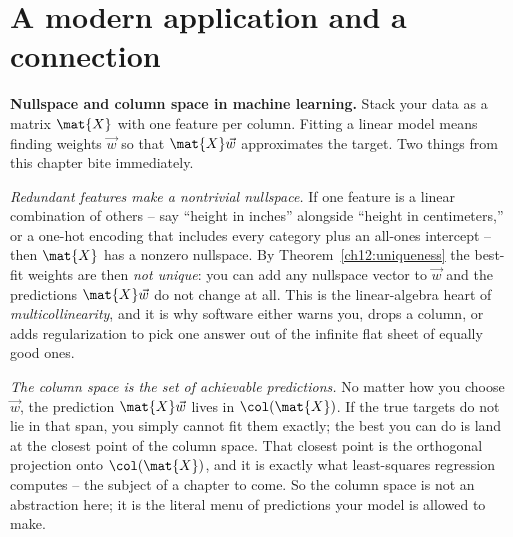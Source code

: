 \section{A modern application and a connection}

\begin{applicationbox}
\textbf{Nullspace and column space in machine learning.} Stack your data as a
matrix $\mat{X}$ with one feature per column. Fitting a linear model means
finding weights $\vec{w}$ so that $\mat{X}\vec{w}$ approximates the target. Two
things from this chapter bite immediately.

\emph{Redundant features make a nontrivial nullspace.} If one feature is a linear
combination of others -- say ``height in inches'' alongside ``height in
centimeters,'' or a one-hot encoding that includes every category plus an
all-ones intercept -- then $\mat{X}$ has a nonzero nullspace. By
Theorem~\ref{ch12:uniqueness} the best-fit weights are then \emph{not unique}:
you can add any nullspace vector to $\vec{w}$ and the predictions
$\mat{X}\vec{w}$ do not change at all. This is the linear-algebra heart of
\emph{multicollinearity}, and it is why software either warns you, drops a
column, or adds regularization to pick one answer out of the infinite flat sheet
of equally good ones.

\emph{The column space is the set of achievable predictions.} No matter how you
choose $\vec{w}$, the prediction $\mat{X}\vec{w}$ lives in $\col(\mat{X})$. If the
true targets do not lie in that span, you simply cannot fit them exactly; the
best you can do is land at the closest point of the column space. That closest
point is the orthogonal projection onto $\col(\mat{X})$, and it is exactly what
least-squares regression computes -- the subject of a chapter to come. So the
column space is not an abstraction here; it is the literal menu of predictions
your model is allowed to make.
\end{applicationbox}


